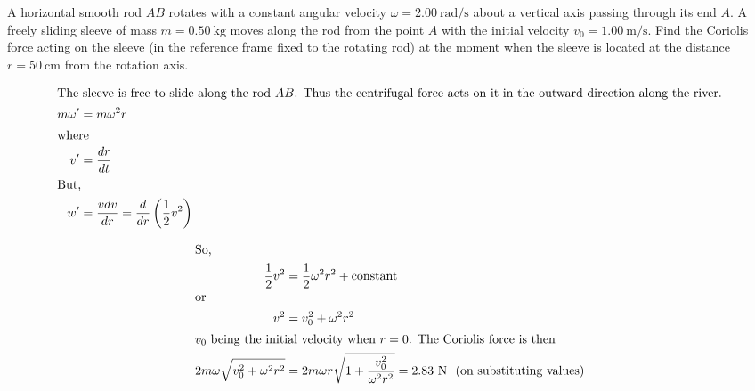 \item A horizontal smooth rod \( AB \) rotates with a constant angular velocity \( \omega = 2.00 \ \text{rad/s} \) about a vertical axis passing through its end \( A \). A freely sliding sleeve of mass \( m = 0.50 \ \text{kg} \) moves along the rod from the point \( A \) with the initial velocity \( v_0 = 1.00 \ \text{m/s} \). Find the Coriolis force acting on the sleeve (in the reference frame fixed to the rotating rod) at the moment when the sleeve is located at the distance \( r = 50 \ \text{cm} \) from the rotation axis.
    \begin{center}
    \end{center}\begin{solution}
    
    \begin{align*}
        \intertext{The sleeve is free to slide along the rod $AB$. Thus the centrifugal force acts on it in the outward direction along the river.}
        m\omega' &= m\omega^2 r \\
        \intertext{where}
        v' &= \frac{dr}{dt} \\
        \intertext{But,}
        w' &= \frac{vdv}{dr} = \frac{d}{dr} \left( \frac{1}{2} v^2 \right)
    \end{align*}

    \begin{align*}
        \intertext{So,}
        \frac{1}{2} v^2 &= \frac{1}{2} \omega^2 r^2 + \text{constant} \\
        \intertext{or}
        v^2 &= v_0^2 + \omega^2 r^2 \\
        \intertext{$v_0$ being the initial velocity when $r = 0$. The Coriolis force is then}
        2m\omega\sqrt{v_0^2 + \omega^2 r^2} &= 2m\omega r \sqrt{1 + \frac{v_0^2}{\omega^2 r^2}} = 2.83 \ \text{N \ (on substituting values)}
    \end{align*}
    
\end{solution}